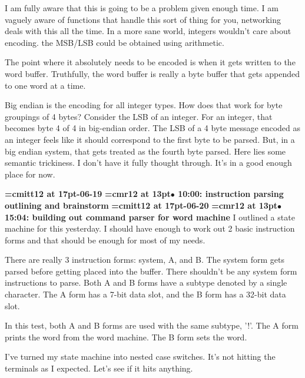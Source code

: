 I am fully aware that this is going to be a problem given enough time. I am vaguely aware of functions that handle this sort of thing for you, networking deals with this all the time. In a more sane world, integers wouldn't care about encoding. the MSB/LSB could be obtained using arithmetic.
\par

The point where it absolutely needs to be encoded is when it gets written to the word buffer. Truthfully, the word buffer is really a byte buffer that gets appended to one word at a time.
\par

Big endian is the encoding for all integer types. How does that work for byte groupings of 4 bytes? Consider the LSB of an integer. For an integer, that becomes byte 4 of 4 in big-endian order. The LSB of a 4 byte message encoded as an integer feels like it should correspond to the first byte to be parsed. But, in a big endian system, that gets treated as the fourth byte parsed. Here lies some semantic trickiness. I don't have it fully thought through. It's in a good enough place for now.
\par

{\medskip\noindent\bf\font\titlefont=cmitt12 at 17pt-06-19}\medskip
{\smallskip\noindent\bf\font\titlefont=cmr12 at 13pt\titlefont $\bullet$ 10:00: instruction parsing outlining and brainstorm}\smallskip
{\medskip\noindent\bf\font\titlefont=cmitt12 at 17pt-06-20}\medskip
{\smallskip\noindent\bf\font\titlefont=cmr12 at 13pt\titlefont $\bullet$ 15:04: building out command parser for word machine}\smallskip
I outlined a state machine for this yesterday. I should have enough to work out 2 basic instruction forms and that should be enough for most of my needs.
\par

There are really 3 instruction forms: system, A, and B. The system form gets parsed before getting placed into the buffer. There shouldn't be any system form instructions to parse. Both A and B forms have a subtype denoted by a single character. The A form has a 7-bit data slot, and the B form has a 32-bit data slot.
\par

In this test, both A and B forms are used with the same subtype, '!'. The A form prints the word from the word machine. The B form sets the word.
\par

I've turned my state machine into nested case switches. It's not hitting the terminals as I expected. Let's see if it hits anything.
\par

